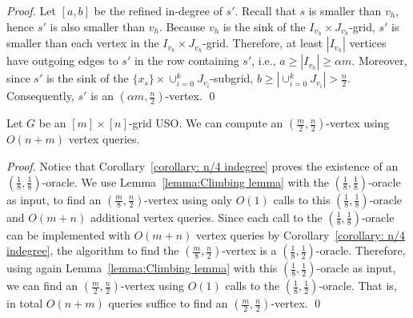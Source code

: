 \documentclass[runningheads,a4paper]{llncs}
\newcommand{\indegree}{refined in-degree\xspace}
\begin{document}
\begin{proof}
Let $[a,b]$ be the \indegree of $s'$.
Recall that $s$ is smaller than $v_h$, hence $s'$ is also smaller than $v_h$.
Because $v_h$ is the sink of the $I_{v_h}\times J_{v_h}$-grid, $s'$ is smaller than each vertex in the $I_{v_h}\times J_{v_h}$-grid.
Therefore, at least $|I_{v_h}|$ vertices have outgoing edges to $s'$ in the row containing $s'$, i.e., $a\geq |I_{v_h}| \geq \alpha m$.
Moreover, since $s'$ is the sink of the $\{x_s\}\times \cup_{i=0}^k J_{v_i}$-subgrid, $b \geq |\cup_{i=0}^k J_{v_i}|  >  \frac{n}{2}$.
Consequently, $s'$ is an $(\alpha m,  \frac{n}{2})$-vertex. \qed
\end{proof}

\begin{corollary}\label{corollary: (m/2,n/2) indegree}
Let $G$ be an $[m]\times [n]$-grid USO. 
We can compute an $( \frac{m}{2}, \frac{n}{2})$-vertex using $O(n + m)$ vertex queries.
\end{corollary}
\begin{proof}
Notice that Corollary~\ref{corollary: n/4 indegree} proves the existence of an $( \frac{1}{8}, \frac{1}{8})$-oracle.
We use Lemma~\ref{lemma:Climbing lemma} with the $(\frac{1}{8}, \frac{1}{8})$-oracle as input, to find an $(\frac{m}{8}, \frac{n}{2})$-vertex using only $O(1)$ calls to this $(\frac{1}{8}, \frac{1}{8})$-oracle and $O(m+n)$ additional vertex queries. Since each call to the  $(\frac{1}{8}, \frac{1}{8})$-oracle can be implemented with $O(m+n)$ vertex queries by Corollary~\ref{corollary: n/4 indegree}, the algorithm to find the $(\frac{m}{8}, \frac{n}{2})$-vertex is a $(\frac{1}{8}, \frac{1}{2})$-oracle. 
Therefore, using again Lemma~\ref{lemma:Climbing lemma} with this $(\frac{1}{8}, \frac{1}{2})$-oracle as input, we can find an $(\frac{m}{2}, \frac{n}{2})$-vertex using $O(1)$ calls to the $(\frac{1}{8}, \frac{1}{2})$-oracle. That is, in total $O(n + m)$ queries suffice to find an $(\frac{m}{2}, \frac{n}{2})$-vertex. \qed
\end{proof}
\end{document}
